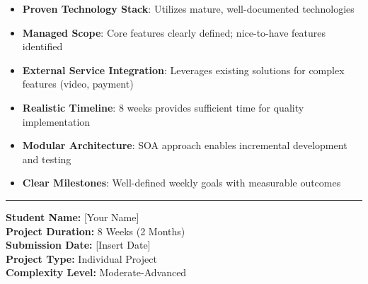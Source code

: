 \documentclass[11pt,a4paper]{article}
\begin{document}
\begin{itemize}[leftmargin=*, itemsep=0.1em]
    \item \textbf{Proven Technology Stack}: Utilizes mature, well-documented technologies
    \item \textbf{Managed Scope}: Core features clearly defined; nice-to-have features identified
    \item \textbf{External Service Integration}: Leverages existing solutions for complex features (video, payment)
    \item \textbf{Realistic Timeline}: 8 weeks provides sufficient time for quality implementation
    \item \textbf{Modular Architecture}: SOA approach enables incremental development and testing
    \item \textbf{Clear Milestones}: Well-defined weekly goals with measurable outcomes
\end{itemize}

\vspace{1em}
\noindent\rule{\textwidth}{0.4pt}

\noindent\textbf{Student Name:} [Your Name]\\
\textbf{Project Duration:} 8 Weeks (2 Months)\\
\textbf{Submission Date:} [Insert Date]\\
\textbf{Project Type:} Individual Project\\
\textbf{Complexity Level:} Moderate-Advanced
\end{document}
